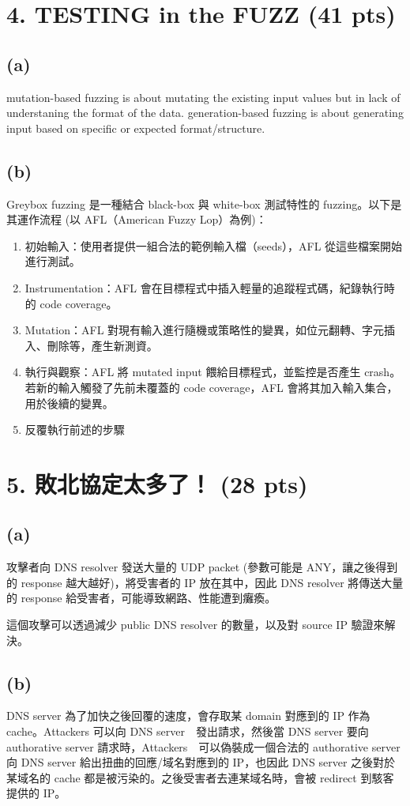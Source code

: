 \documentclass[12pt]{article}
\begin{document}
\newpage
\section*{4. TESTING in the FUZZ (41 pts)}
\subsection*{(a)}
mutation-based fuzzing is about mutating the existing input values but in lack of understaning the format of the data. generation-based fuzzing is about generating input based on specific or expected format/structure.
\subsection*{(b)}
Greybox fuzzing 是一種結合 black-box 與 white-box 測試特性的 fuzzing。以下是其運作流程 (以 AFL（American Fuzzy Lop）為例)：
\begin{enumerate}
    \item 初始輸入：使用者提供一組合法的範例輸入檔（seeds），AFL 從這些檔案開始進行測試。
    \item Instrumentation：AFL 會在目標程式中插入輕量的追蹤程式碼，紀錄執行時的 code coverage。
    \item Mutation：AFL 對現有輸入進行隨機或策略性的變異，如位元翻轉、字元插入、刪除等，產生新測資。
    \item 執行與觀察：AFL 將 mutated input 餵給目標程式，並監控是否產生 crash。若新的輸入觸發了先前未覆蓋的 code coverage，AFL 會將其加入輸入集合，用於後續的變異。
    \item 反覆執行前述的步驟
\end{enumerate}


\newpage
\section*{5. 敗北協定太多了！ (28 pts)}
\subsection*{(a)}
攻擊者向 DNS resolver 發送大量的 UDP packet (參數可能是 ANY，讓之後得到的 response 越大越好)，將受害者的 IP 放在其中，因此 DNS resolver 將傳送大量的 response 給受害者，可能導致網路、性能遭到癱瘓。

這個攻擊可以透過減少 public DNS resolver 的數量，以及對 source IP 驗證來解決。
\subsection*{(b)}
DNS server 為了加快之後回覆的速度，會存取某 domain 對應到的 IP 作為 cache。Attackers 可以向 DNS server　發出請求，然後當 DNS server 要向 authorative server 請求時，Attackers　可以偽裝成一個合法的 authorative server 向 DNS server 給出扭曲的回應/域名對應到的 IP，也因此 DNS server 之後對於某域名的 cache 都是被污染的。之後受害者去連某域名時，會被 redirect 到駭客提供的 IP。
\end{document}
